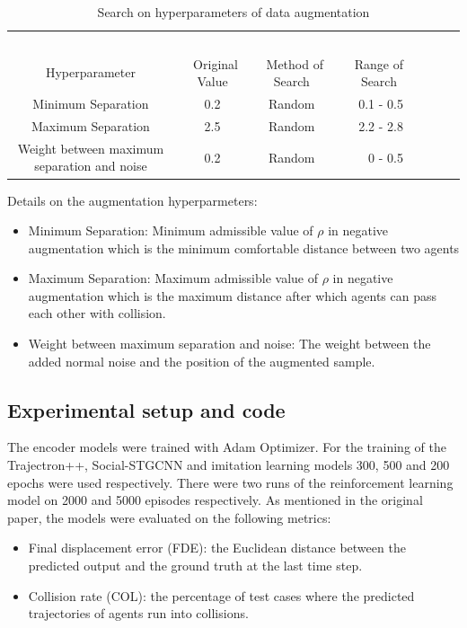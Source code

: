 \begin{table}[H]
\caption{Search on hyperparameters of data augmentation}
\centering %
\begin{tabular}{ccc rrrrr} 
\hline 
&\ \ \ \ \ \\
Hyperparameter&\ Original Value&\ Method of Search&\ Range of Search\ \\ [0.5ex]
\hline 
Minimum Separation &  0.2 & Random & 0.1 - 0.5\\
Maximum Separation & 2.5 & Random & 2.2 - 2.8\\
Weight between maximum separation and noise &  0.2 & Random & 0 - 0.5\\
\hline
\end{tabular}
\label{tab:hresult}
\end{table}

Details on the augmentation hyperparmeters:
\begin{itemize}
    \item Minimum Separation: Minimum admissible value of $\rho$ in negative augmentation which is the minimum comfortable distance between two agents
    \item Maximum Separation: Maximum admissible value of $\rho$ in negative augmentation which is the maximum distance after which agents can pass each other with collision.
    \item Weight between maximum separation and noise: The weight between the added normal noise and the position of the augmented sample.
\end{itemize}

\subsection{Experimental setup and code}
The encoder models were trained with Adam Optimizer. For the training of the Trajectron++, Social-STGCNN and imitation learning models 300, 500 and 200 epochs were used respectively. There were two runs of the reinforcement learning model on 2000 and 5000 episodes respectively. As mentioned in the original paper, the models were evaluated on the following metrics:
\begin{itemize}
  \item Final displacement error (FDE): the Euclidean distance between the predicted output and the ground truth at the last time step.
  \item Collision rate (COL): the percentage of test cases where the predicted trajectories of agents run into collisions.
\end{itemize}

